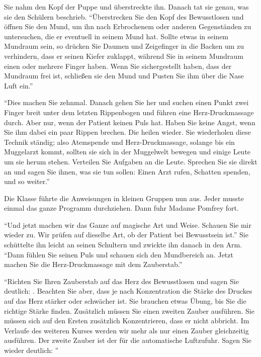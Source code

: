 Sie nahm den Kopf der Puppe und überstreckte ihn. Danach tat sie genau, was sie den Schülern beschrieb. \enquote{Überstrecken Sie den Kopf des Bewusstlosen und öffnen Sie den Mund, um ihn nach Erbrochenem oder anderen Gegenständen zu untersuchen, die er eventuell in seinem Mund hat. Sollte etwas in seinem Mundraum sein, so drücken Sie Daumen und Zeigefinger in die Backen um zu verhindern, dass er seinen Kiefer zuklappt, während Sie in seinem Mundraum einen oder mehrere Finger haben. Wenn Sie sichergestellt haben, dass der Mundraum frei ist, schließen sie den Mund und Pusten Sie ihm über die Nase Luft ein.}

\enquote{Dies machen Sie zehnmal. Danach gehen Sie her und suchen einen Punkt zwei Finger breit unter dem letzten Rippenbogen und führen eine Herz-Druckmassage durch. Aber nur, wenn der Patient keinen Puls hat. Haben Sie keine Angst, wenn Sie ihm dabei ein paar Rippen brechen. Die heilen wieder. Sie wiederholen diese Technik ständig; also Atemspende und Herz-Druckmassage, solange bis ein Muggelarzt kommt, sollten sie sich in der Muggelwelt bewegen und einige Leute um sie herum stehen. Verteilen Sie Aufgaben an die Leute. Sprechen Sie sie direkt an und sagen Sie ihnen, was sie tun sollen: Einen Arzt rufen, Schatten spenden, und so weiter.}

Die Klasse führte die Anweisungen in kleinen Gruppen nun aus. Jeder musste einmal das ganze Programm durchziehen. Dann fuhr Madame Pomfrey fort.

\enquote{Und jetzt machen wir das Ganze auf magische Art und Weise. Schauen Sie mir wieder zu. Wir prüfen auf dieselbe Art, ob der Patient bei Bewusstsein ist.} Sie schüttelte ihn leicht an seinen Schultern und zwickte ihn danach in den Arm. \enquote{Dann fühlen Sie seinen Puls und schauen sich den Mundbereich an. Jetzt machen Sie die Herz-Druckmassage mit dem Zauberstab.}

\enquote{Richten Sie Ihren Zauberstab auf das Herz des Bewusstlosen und sagen Sie deutlich: . Beachten Sie aber, dass je nach Konzentration die Stärke des Druckes auf das Herz stärker oder schwächer ist. Sie brauchen etwas Übung, bis Sie die richtige Stärke finden. Zusätzlich müssen Sie einen zweiten Zauber ausführen. Sie müssen sich auf den Ersten zusätzlich Konzentrieren, dass er nicht abbricht. Im Verlaufe des weiteren Kurses werden wir mehr als nur einen Zauber gleichzeitig ausführen. Der zweite Zauber ist der für die automatische Luftzufuhr. Sagen Sie wieder deutlich: }

